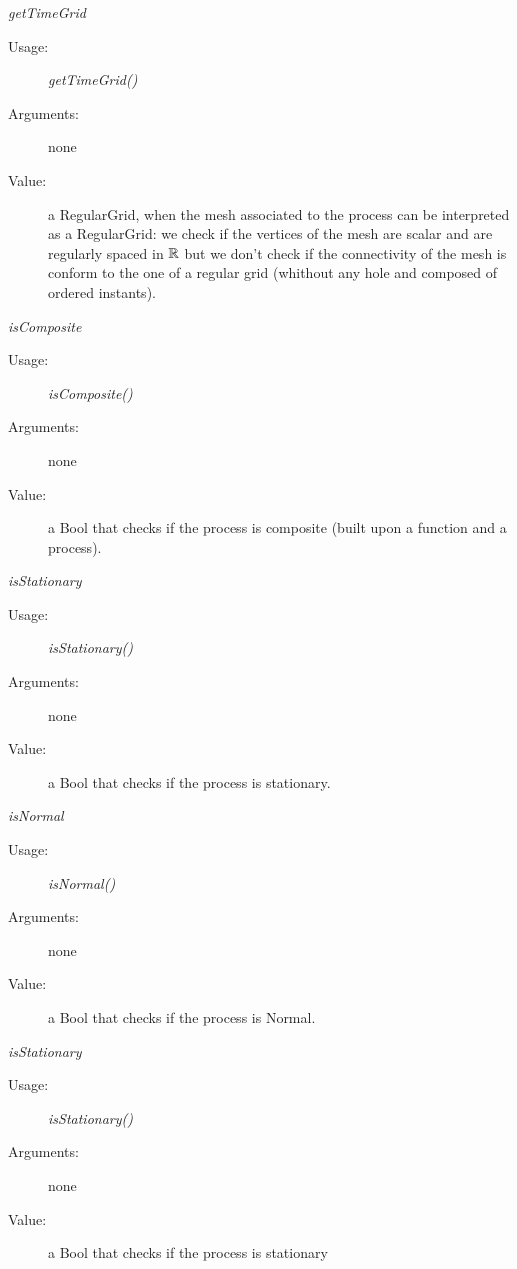 \begin{description}
\begin{description}
\item \textit{getTimeGrid}
\begin{description}
\item[Usage:] \textit{getTimeGrid()}
\item[Arguments:] none
\item[Value:] a RegularGrid, when the mesh associated to the process can be interpreted as a RegularGrid: we check if the vertices of the mesh are scalar and are regularly spaced in ${\mathbb R}$ but we don't check if the connectivity of the mesh is conform to the one of a regular grid (whithout any hole and composed of ordered instants).
\end{description}
\bigskip

\item \textit{isComposite}
\begin{description}
\item[Usage:] \textit{isComposite()}
\item[Arguments:] none
\item[Value:] a Bool that checks  if the process is composite (built upon a function and a process).
\end{description}
\bigskip

\item \textit{isStationary}
\begin{description}
\item[Usage:] \textit{isStationary()}
\item[Arguments:] none
\item[Value:]a Bool that checks if the process is stationary.
\end{description}
\bigskip

\item \textit{isNormal}
\begin{description}
\item[Usage:] \textit{isNormal()}
\item[Arguments:] none
\item[Value:] a Bool that checks if the process is Normal.
\end{description}
\bigskip

\item \textit{isStationary}
\begin{description}
\item[Usage:] \textit{isStationary()}
\item[Arguments:] none
\item[Value:] a Bool that checks if the process is stationary
\end{description}
\bigskip


\end{description}
\end{description}
